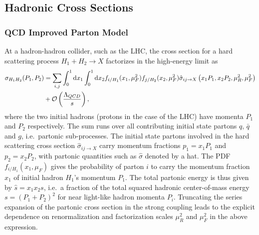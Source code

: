 \subsection{Hadronic Cross Sections}
\subsubsection{QCD Improved Parton Model}
\label{sec:partonmodel}
 At a hadron-hadron collider, such as the LHC, the cross section for a hard scattering process $H_1+H_2\rightarrow
X$ factorizes in the high-energy limit as
\begin{align}
\label{eq:factorization}
  \sigma_{H_1 H_2}(P_1,P_2) &= \sum_{i,j}\int_0^1\dd x_1 \int_0^1 \dd
  x_2f_{i/H_1}(x_1,\mu_F^2)f_{j/H_2}(x_2,\mu_F^2)\hat \sigma_{ij\rightarrow
    X}\left(x_1 P_1,x_2 P_2,\mu_R^2,{\mu_F^2}\right) \notag \\
&+\mathcal{O}\left(\frac{\Lambda_{QCD}}{s}\right),
\end{align}
where the two initial hadrons (protons in the case of the LHC) have momenta $P_1$ and $P_2$
respectively. The sum runs over all contributing initial state
partons $q$, $\bar{q}$ and $g$, i.e.~partonic
sub-processes. The initial state partons involved in the hard
scattering cross section $\hat \sigma_{ij\rightarrow
  X}$ carry
momentum fractions $p_1=x_1P_1$ and $p_2=x_2P_2$, with partonic
quantities such as $\hat \sigma$ denoted by a hat. The PDF $f_{i/H_1}(x_1,\mu_F)$ gives the probability of parton
$i$ to carry the momentum fraction $x_1$ of initial hadron $H_1$'s
momentum $P_1$. The total partonic energy is
thus given by $\hat s=x_1x_2 s$, i.e.~a fraction of the total squared hadronic
center-of-mass energy $s=(P_1+P_2)^2$ for near light-like hadron momenta $P_i$. Truncating the series
expansion of the partonic cross section in the strong coupling leads to the explicit dependence on renormalization and
factorization scales $\mu_R^2$ and $\mu_F^2$ in the above expression.



